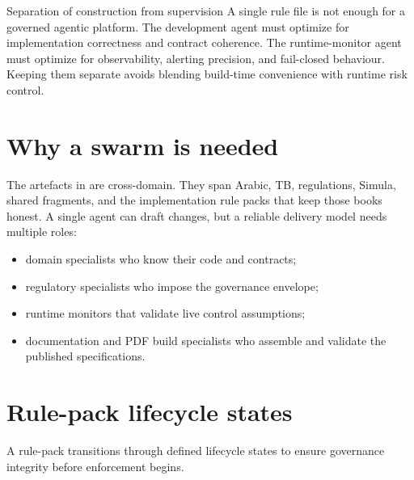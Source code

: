 \documentclass[11pt,a4paper,twoside]{report}
\newcommand{\filepath}[1]{{\color{pathcolor}\path{#1}}}
\begin{document}
\begin{adrbox}{Separation of construction from supervision}
A single rule file is not enough for a governed agentic platform. The
development agent must optimize for implementation correctness and
contract coherence. The runtime-monitor agent must optimize for
observability, alerting precision, and fail-closed behaviour. Keeping
them separate avoids blending build-time convenience with runtime risk
control.
\end{adrbox}

\section{Why a swarm is needed}

The artefacts in \filepath{docs/pdf/specs/} are cross-domain. They span
Arabic, TB, regulations, Simula, shared fragments, and the
implementation rule packs that keep those books honest. A single agent
can draft changes, but a reliable delivery model needs multiple roles:
\begin{itemize}
\item domain specialists who know their code and contracts;
\item regulatory specialists who impose the governance envelope;
\item runtime monitors that validate live control assumptions;
\item documentation and PDF build specialists who assemble and
validate the published specifications.
\end{itemize}

\section{Rule-pack lifecycle states}
\label{sec:lifecycle-states}

A rule-pack transitions through defined lifecycle states to ensure
governance integrity before enforcement begins.
\end{document}
